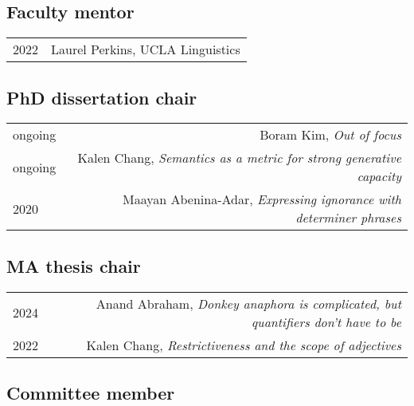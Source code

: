 \documentclass[12pt]{article}
\begin{document}
\subsection*{Faculty mentor}

\begin{longtable}{LR}
  2022    & Laurel Perkins, UCLA Linguistics
\end{longtable}

\subsection*{PhD dissertation chair}

\begin{longtable}{LR}
  ongoing & Boram Kim, \textit{Out of focus}
  \\
  ongoing & Kalen Chang, \textit{Semantics as a metric for strong generative
            capacity}
  \\
  2020    & Maayan Abenina-Adar, \textit{Expressing ignorance with determiner
            phrases}
\end{longtable}

\subsection*{MA thesis chair}

\begin{longtable}{LR}
  2024    & Anand Abraham, \textit{Donkey anaphora is complicated, but
            quantifiers don't have to be}\\
  2022    & Kalen Chang, \textit{Restrictiveness and the scope of adjectives}
\end{longtable}

\subsection*{Committee member}
\end{document}
